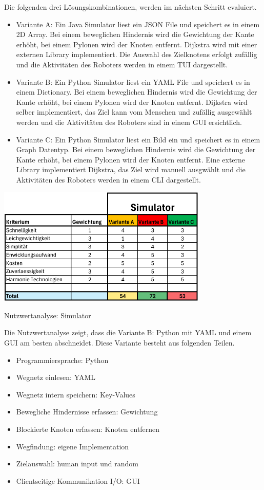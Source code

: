 Die folgenden drei Lösungskombinationen, werden im nächsten Schritt evaluiert.

\begin{itemize}
    \item Variante A: Ein Java Simulator liest ein JSON File und speichert es in einem 2D Array. Bei einem beweglichen Hindernis wird die Gewichtung der Kante erhöht, bei einem Pylonen wird der Knoten entfernt. Dijkstra wird mit einer externen Library implementiert. Die Auswahl des Zielknotens erfolgt zufällig und die Aktivitäten des Roboters werden in einem TUI dargestellt.
    \item Variante B: Ein Python Simulator liest ein YAML File und speichert es in einem Dictionary. Bei einem beweglichen Hindernis wird die Gewichtung der Kante erhöht, bei einem Pylonen wird der Knoten entfernt. Dijkstra wird selber implementiert, das Ziel kann vom Menschen und zufällig ausgewählt werden und die Aktivitäten des Roboters sind in einem GUI ersichtlich.
    \item Variante C: Ein Python Simulator liest ein Bild ein und speichert es in einem Graph Datentyp. Bei einem beweglichen Hindernis wird die Gewichtung der Kante erhöht, bei einem Pylonen wird der Knoten entfernt. Eine externe Library implementiert Dijkstra, das Ziel wird manuell ausgwählt und die Aktivitäten des Roboters werden in einem CLI dargestellt.
\end{itemize}

\begin{table}[H]
\centering
\includegraphics[width=0.75\textwidth]{assets/Nutzwertanalyse-Simulator.pdf}
\caption{Nutzwertanalyse: Simulator}
\label{table:nutzwert-Simulator}
\end{table}

Die Nutzwertanalyse zeigt, dass die Variante B: Python mit YAML und einem GUI am besten abschneidet. Diese Variante besteht aus folgenden Teilen.

\begin{itemize}
    \item Programmiersprache: Python
    \item Wegnetz einlesen: YAML
    \item Wegnetz intern speichern: Key-Values
    \item Bewegliche Hindernisse erfassen: Gewichtung
    \item Blockierte Knoten erfassen: Knoten entfernen
    \item Wegfindung: eigene Implementation
    \item Zielauswahl: human input und random
    \item Clientseitige Kommunikation I/O: GUI
\end{itemize}